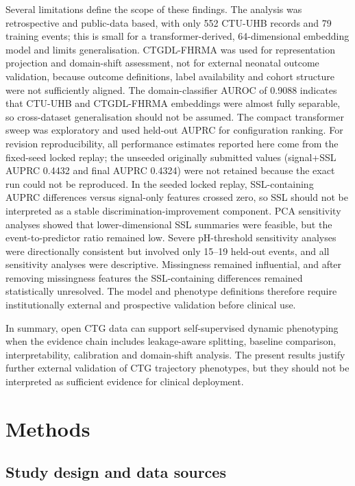\documentclass[utf8]{FrontiersinHarvard}
\begin{document}
Several limitations define the scope of these findings. The analysis was retrospective and public-data based, with only 552 CTU-UHB records and 79 training events; this is small for a transformer-derived, 64-dimensional embedding model and limits generalisation. CTGDL-FHRMA was used for representation projection and domain-shift assessment, not for external neonatal outcome validation, because outcome definitions, label availability and cohort structure were not sufficiently aligned. The domain-classifier AUROC of 0.9088 indicates that CTU-UHB and CTGDL-FHRMA embeddings were almost fully separable, so cross-dataset generalisation should not be assumed. The compact transformer sweep was exploratory and used held-out AUPRC for configuration ranking. For revision reproducibility, all performance estimates reported here come from the fixed-seed locked replay; the unseeded originally submitted values (signal+SSL AUPRC 0.4432 and final AUPRC 0.4324) were not retained because the exact run could not be reproduced. In the seeded locked replay, SSL-containing AUPRC differences versus signal-only features crossed zero, so SSL should not be interpreted as a stable discrimination-improvement component. PCA sensitivity analyses showed that lower-dimensional SSL summaries were feasible, but the event-to-predictor ratio remained low. Severe pH-threshold sensitivity analyses were directionally consistent but involved only 15--19 held-out events, and all sensitivity analyses were descriptive. Missingness remained influential, and after removing missingness features the SSL-containing differences remained statistically unresolved. The model and phenotype definitions therefore require institutionally external and prospective validation before clinical use.

In summary, open CTG data can support self-supervised dynamic phenotyping when the evidence chain includes leakage-aware splitting, baseline comparison, interpretability, calibration and domain-shift analysis. The present results justify further external validation of CTG trajectory phenotypes, but they should not be interpreted as sufficient evidence for clinical deployment.

\section{Methods}

\subsection{Study design and data sources}
\end{document}

